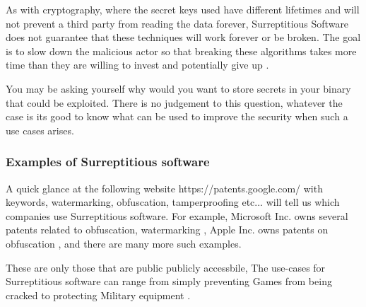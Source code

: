 As with cryptography, where the secret keys used have different lifetimes and will not prevent a third party from reading the data forever,
Surreptitious Software does not guarantee that these techniques will work forever or be broken. 
The goal is to slow down the malicious actor so that breaking these algorithms takes more time than they are willing to invest and potentially give up \cite{serr-soft}.

You may be asking yourself why would you want to store secrets in your binary that could be exploited. There is no
judgement to this question, whatever the case is its good to know what can be used to improve the security when such
a use cases arises.

\subsubsection{Examples of Surreptitious software}

A quick glance at the following website https://patents.google.com/ with keywords, watermarking, obfuscation, tamperproofing etc... will tell us which companies use Surreptitious software.
For example, Microsoft Inc. owns several patents related to obfuscation, watermarking \cite{ms-patent01},
Apple Inc. owns patents on obfuscation \cite{apple-patent01}, and there are many more such examples.

These are only those that are public publicly accessbile, The use-cases for Surreptitious software can range from simply
preventing Games from being cracked to protecting Military equipment \cite{serr-soft}.






